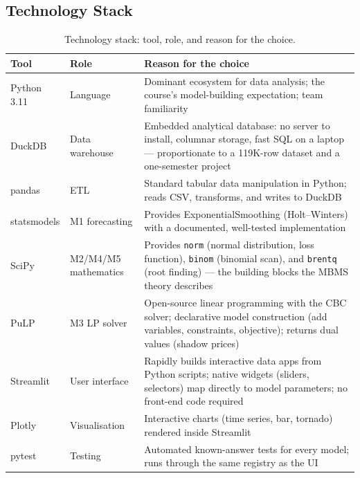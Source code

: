 \subsection{Technology Stack}

\begin{table}[H]
\centering
\caption{Technology stack: tool, role, and reason for the choice.}
\label{tab:techstack}
\begin{tabularx}{\textwidth}{@{}l l X@{}}
\toprule
\textbf{Tool} & \textbf{Role} & \textbf{Reason for the choice} \\
\midrule
Python 3.11 & Language & Dominant ecosystem for data analysis; the course's model-building expectation; team familiarity \\
DuckDB & Data warehouse & Embedded analytical database: no server to install, columnar storage, fast SQL on a laptop --- proportionate to a 119K-row dataset and a one-semester project \\
pandas & ETL & Standard tabular data manipulation in Python; reads CSV, transforms, and writes to DuckDB \\
statsmodels & M1 forecasting & Provides ExponentialSmoothing (Holt--Winters) with a documented, well-tested implementation \\
SciPy & M2/M4/M5 mathematics & Provides \texttt{norm} (normal distribution, loss function), \texttt{binom} (binomial scan), and \texttt{brentq} (root finding) --- the building blocks the MBMS theory describes \\
PuLP & M3 LP solver & Open-source linear programming with the CBC solver; declarative model construction (add variables, constraints, objective); returns dual values (shadow prices) \\
Streamlit & User interface & Rapidly builds interactive data apps from Python scripts; native widgets (sliders, selectors) map directly to model parameters; no front-end code required \\
Plotly & Visualisation & Interactive charts (time series, bar, tornado) rendered inside Streamlit \\
pytest & Testing & Automated known-answer tests for every model; runs through the same registry as the UI \\
\bottomrule
\end{tabularx}
\end{table}


